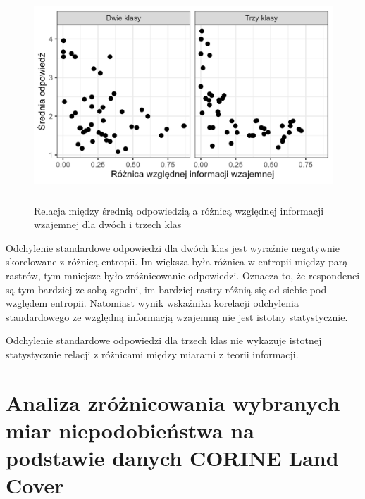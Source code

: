 \documentclass{amuthesis}
\begin{document}
\begin{figure}[t]

{\centering \includegraphics[width=5.20833in,height=3.125in]{figures/answer_mean_vs_relmutinf_diff.png}

}

\caption{\label{fig-answer_mean_vs_relmutinf_diff}Relacja między średnią
odpowiedzią a różnicą względnej informacji wzajemnej dla dwóch i trzech
klas}

\end{figure}

Odchylenie standardowe odpowiedzi dla dwóch klas jest wyraźnie
negatywnie skorelowane z różnicą entropii. Im większa była różnica w
entropii między parą rastrów, tym mniejsze było zróżnicowanie
odpowiedzi. Oznacza to, że respondenci są tym bardziej ze sobą zgodni,
im bardziej rastry różnią się od siebie pod względem entropii. Natomiast
wynik wskaźnika korelacji odchylenia standardowego ze względną
informacją wzajemną nie jest istotny statystycznie.

Odchylenie standardowe odpowiedzi dla trzech klas nie wykazuje istotnej
statystycznie relacji z różnicami między miarami z teorii informacji.


\hypertarget{analiza-zruxf3ux17cnicowania-wybranych-miar-niepodobieux144stwa-na-podstawie-danych-corine-land-cover}{%
\chapter{Analiza zróżnicowania wybranych miar niepodobieństwa na
podstawie danych CORINE Land
Cover}\label{analiza-zruxf3ux17cnicowania-wybranych-miar-niepodobieux144stwa-na-podstawie-danych-corine-land-cover}}
\end{document}

